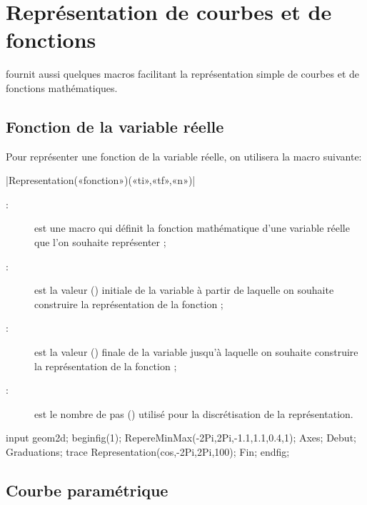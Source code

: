 \documentclass[a4paper,french]{article}
\begin{document}
\section{Représentation de courbes et de fonctions}

\mpgeomdd{} fournit aussi quelques macros facilitant la représentation simple de
courbes et de fonctions mathématiques.

\subsection{Fonction de la variable réelle}

Pour représenter une fonction de la variable réelle, on utilisera la macro
suivante:
\begin{colourband}
  \macro|Representation(«fonction»)(«ti»,«tf»,«n»)|
  \begin{description}
    \item[:] est une macro \MP{} qui définit la fonction
    mathématique d'une variable réelle que l'on souhaite représenter ;
    \item[:] est la valeur () initiale de la variable à
    partir de laquelle on souhaite construire la représentation de la fonction ;
    \item[:] est la valeur () finale de la variable
    jusqu'à laquelle on souhaite construire la représentation de la fonction ;
    \item[:] est le nombre de pas () utilisé pour la
    discrétisation de la représentation.
  \end{description}
\end{colourband}

\begin{ExempleMP}
input geom2d;
beginfig(1);
RepereMinMax(-2Pi,2Pi,-1.1,1.1,0.4,1);
Axes;
Debut;
  Graduations;
  trace Representation(cos,-2Pi,2Pi,100);
Fin;
endfig;
  \end{ExempleMP}

\subsection{Courbe paramétrique}
\end{document}
